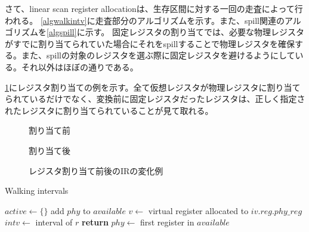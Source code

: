 \documentclass[../main.tex]{subfiles}
\begin{document}
さて、linear scan register allocationは、生存区間に対する一回の走査によって行われる。
\cref{algwalkintv}に走査部分のアルゴリズムを示す。また、spill関連のアルゴリズムを\cref{algspill}に示す。
固定レジスタの割り当てでは、必要な物理レジスタがすでに割り当てられていた場合にそれをspillすることで物理レジスタを確保する。また、spillの対象のレジスタを選ぶ際に固定レジスタを避けるようにしている。それ以外はほぼ\cite{poletto1999linear}の通りである。

\cref{ccc_alloc_fig}にレジスタ割り当ての例を示す。全て仮想レジスタが物理レジスタに割り当てられているだけでなく、変換前に固定レジスタだったレジスタは、正しく指定されたレジスタに割り当てられていることが見て取れる。

\begin{figure}[h]
  \begin{minipage}{0.50\hsize}
    \centering
    
    \caption*{割り当て前}
  \end{minipage}
  \begin{minipage}{0.50\hsize}
    \centering
    
    \caption*{割り当て後}
  \end{minipage}
  \caption{レジスタ割り当て前後のIRの変化例}
  \label{ccc_alloc_fig}
\end{figure}

\begin{algorithm}
\caption{Walking intervals}\label{algwalkintv}
\begin{algorithmic}[1]
   \State $active \gets \{\}$
     \State add $phy$ to $available$ 
   \EndFor
     \State {}
         \State {}
       \Else
         \State {}
       \EndIf
         \State $v \gets$ virtual register allocated to $iv.reg.phy\_reg$
         \State {}
       \EndIf
       \State {}
     \EndIf
   \EndFor
\EndProcedure
{}
   
    \State $intv \gets$ interval of $r$
      \State \textbf{return}
    \EndIf
    \State {}
  \EndFor
\EndProcedure
{}
  \State $phy \gets$ first register in $available$ 
  \State {}
\EndProcedure
\end{algorithmic}
\end{algorithm}
\end{document}
